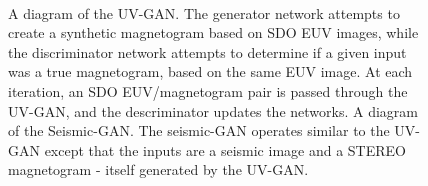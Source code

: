 \documentclass[11pt,a4paper,onecolumn]{report}
\begin{document}
  

\begin{figure}
  \centering
  \centering
  \\
  \caption{ A diagram of the UV-GAN. The generator network
  attempts to create a synthetic magnetogram based on SDO EUV images, while the
  discriminator network attempts to determine if a given input was a true magnetogram,
  based on the same EUV image. At each iteration, an SDO EUV/magnetogram pair is
  passed through the UV-GAN, and the descriminator updates the networks.
   A diagram of the Seismic-GAN. The seismic-GAN
  operates similar to the UV-GAN except that the inputs are a seismic image and
  a STEREO magnetogram - itself generated by the UV-GAN.}
  \label{fig:solar_gans_diagram}
\end{figure}
\end{document}
